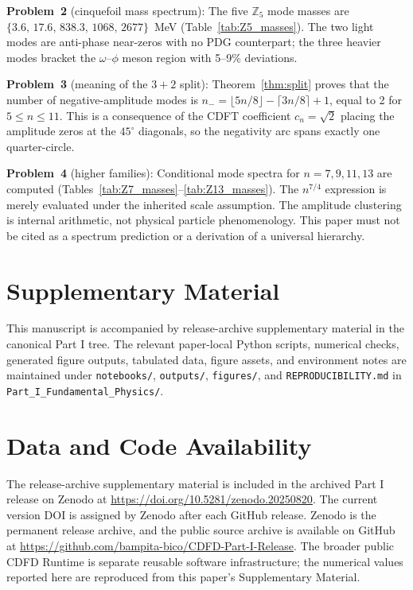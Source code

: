 \documentclass[11pt]{article}
\begin{document}
\textbf{Problem~2} (cinquefoil mass spectrum):
The five $\mathbb{Z}_5$ mode masses are
$\{3.6,\, 17.6,\, 838.3,\, 1068,\, 2677\}$~MeV
(Table~\ref{tab:Z5_masses}).
The two light modes are anti-phase near-zeros with no PDG counterpart;
the three heavier modes bracket the $\omega$--$\phi$ meson region with
5--9\% deviations.

\textbf{Problem~3} (meaning of the $3+2$ split):
Theorem~\ref{thm:split} proves that the number of negative-amplitude modes
is $n_- = \lfloor 5n/8\rfloor - \lceil 3n/8\rceil + 1$, equal to 2 for
$5 \leq n \leq 11$.
This is a consequence of the CDFT coefficient $c_n = \sqrt{2}$ placing the
amplitude zeros at the $45^\circ$ diagonals, so the negativity arc spans
exactly one quarter-circle.

\textbf{Problem~4} (higher families):
Conditional mode spectra for $n = 7, 9, 11, 13$ are computed
(Tables~\ref{tab:Z7_masses}--\ref{tab:Z13_masses}).
The $n^{7/4}$ expression is merely evaluated under the inherited scale
assumption. The amplitude clustering is internal arithmetic, not physical
particle phenomenology. This paper must not be cited as a spectrum prediction
or a derivation of a universal hierarchy.


\section*{Supplementary Material}

This manuscript is accompanied by release-archive supplementary material in
the canonical Part I tree. The relevant paper-local Python scripts, numerical checks, generated figure outputs,
tabulated data, figure assets, and environment notes are maintained under
\texttt{notebooks/}, \texttt{outputs/}, \texttt{figures/}, and
\texttt{REPRODUCIBILITY.md} in \texttt{Part\_I\_Fundamental\_Physics/}.


\section*{Data and Code Availability}

The release-archive supplementary material is included in the archived Part I
release on Zenodo at \url{https://doi.org/10.5281/zenodo.20250820}. The current version DOI is assigned by Zenodo after each GitHub release. Zenodo is the
permanent release archive, and the public source archive is available on GitHub at
\url{https://github.com/bampita-bico/CDFD-Part-I-Release}. The broader public CDFD
Runtime is separate reusable software infrastructure; the numerical values reported
here are reproduced from this paper's Supplementary Material.
\end{document}
